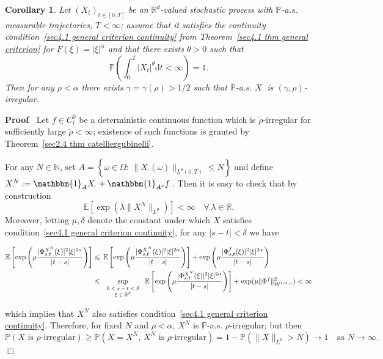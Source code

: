 \documentclass[10pt]{article}
\newcommand{\assign}{:=}
\newcommand{\mathd}{\mathrm{d}}
\newcommand{\tmscript}[1]{\text{\scriptsize{$#1$}}}
\newenvironment{proof}{\noindent\textbf{Proof\ }}{\hspace*{\fill}$\Box$\medskip}
\newtheorem{corollary}[theorem]{Corollary}
\begin{document}
\begin{corollary}
  \label{sec4.1 cor weaker rho irr}Let $(X_t)_{t \in [0, T]}$ be an
  $\mathbb{R}^d$-valued stochastic process with $\mathbb{P}$-a.s. measurable
  trajectories, $T < \infty$; assume that it satisfies the continuity
  condition~{\eqref{sec4.1 general criterion continuity}} from
  Theorem~\ref{sec4.1 thm general criterion} for $F (\xi) = | \xi |^{\alpha}$
  and that there exists $\theta > 0$ such that
  \[ \mathbb{P} \left( \int_0^T | X_t |^{\theta} \mathd t < \infty \right) =
     1. \]
  Then for any $\rho < \alpha$ there exists $\gamma = \gamma (\rho) > 1 / 2$
  such that $\mathbb{P}$-a.s. $X_{\cdot}$ is $(\gamma,
  \rho)$\mbox{-}irregular.
\end{corollary}

\begin{proof}
  Let $f \in C^0_t$ be a deterministic continuous function which is
  $\tilde{\rho}$-irregular for sufficiently large $\tilde{\rho} < \infty$;
  existence of such functions is granted by Theorem~\ref{sec2.4 thm
  catelliergubinelli}.
  
  For any $N \in \mathbb{N}$, set $A = \left\{ \omega \in \Omega : \, \|
  X_{\cdot} (\omega) \|_{L^{\theta} (0, T)} \leqslant N \right\}$ and define
  $X^N_{\cdot} \assign \mathbbm{1}_A X_{\cdot} + \mathbbm{1}_{A^c} f_{\cdot}$.
  Then it is easy to check that by construction
  \[ \mathbb{E} [\exp (\lambda \| X^N_{\cdot} \|_{L^{\theta}})] < \infty \quad
     \forall \, \lambda \in \mathbb{R}. \]
  Moreover, letting $\mu, \delta$ denote the constant under which $X$
  satisfies condition~{\eqref{sec4.1 general criterion continuity}}, for any
  $| s - t | < \delta$ we have
  
  \begin{align*}
    \mathbb{E} \left[ \exp \left( \mu \frac{| \Phi^{X^N}_{s, t} (\xi) |^2 |
    \xi |^{2 \alpha}}{| t - s |} \right) \right] & \leqslant \, \mathbb{E}
    \left[ \exp \left( \mu \frac{| \Phi^{X^N}_{s, t} (\xi) |^2 | \xi |^{2
    \alpha}}{| t - s |} \right) \right] + \exp \left( \mu \frac{| \Phi^f_{s,
    t} (\xi) |^2 | \xi |^{2 \alpha}}{| t - s |} \right)\\
    & \leqslant \, \sup_{\tmscript{\begin{array}{c}
      0 < s - t < \delta\\
      \xi \in \mathbb{R}^d
    \end{array}}} \, \mathbb{E} \left[ \exp \left( \mu \frac{| \Phi^{X^N}_{s,
    t} (\xi) |^2 | \xi |^{2 \alpha}}{| t - s |} \right) \right] + \exp (\mu \|
    \Phi^f \|_{\mathcal{W}^{1 / 2, \alpha}}^2) < \infty
  \end{align*}
  
  which implies that $X^N$ also satisfies condition~{\eqref{sec4.1 general
  criterion continuity}}. Therefore, for fixed $N$ and $\rho < \alpha$, $X^N$
  is $\mathbb{P}$\mbox{-}a.s. $\rho$\mbox{-}irregular; but then
  \[ \mathbb{P} \left( X \text{ is } \rho \text{-irregular} \right) \geqslant
     \mathbb{P} \left( X = X^N, \, X^N \text{ is } \rho \text{-irregular}
     \right) = 1 -\mathbb{P} (\| X \|_{L^{\theta}} > N) \rightarrow 1 \quad
     \text{as } N \rightarrow \infty . \]
\end{proof}
\end{document}
